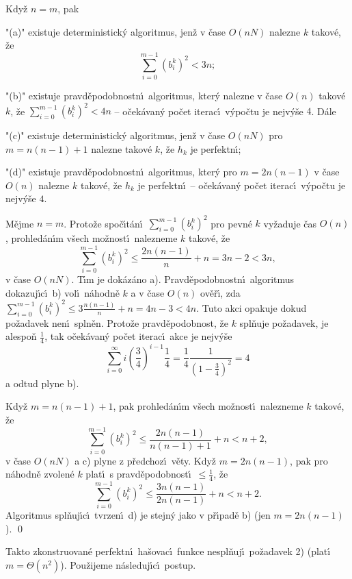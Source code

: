 Kdy\v z $n=m$, pak 
\roster
\item"{(a)}"
existuje deterministick\'y algoritmus, jen\v z v \v case $O(nN)$ 
nalezne $k$ takov\'e, \v ze $$\sum_{i=0}^{m-1}(b_i^k)^2<3n;$$
\item"{(b)}"
existuje pravd\v epodobnostn\'\i\ algoritmus, kter\'y 
nalezne v \v case $O(n)$ takov\'e $k$, \v ze $\sum_{i=0}^{m-1}(b_
i^k)^2<4n$ -- o\v cek\'avan\'y po\v cet iterac\'\i\ v\'ypo\v ctu je nejv\'y\v se $
4$.
\endroster
D\'ale 
\roster
\item"{(c)}"
existuje deterministick\'y algoritmus, jen\v z v \v case $O(nN)$ pro 
$m=n(n-1)+1$ nalezne takov\'e $k$, \v ze $h_k$ je 
perfektn\'\i ;
\item"{(d)}"
existuje pravd\v epodobnostn\'\i\ algoritmus, kter\'y pro 
$m=2n(n-1)$ v \v case $O(n)$ nalezne $k$ takov\'e, \v ze $h_k$ je 
perfektn\'\i\ -- o\v cek\'avan\'y po\v cet iterac\'\i\ v\'ypo\v ctu 
je nejv\'y\v se $4$.
\endroster
\endproclaim

M\v ejme $n=m$. Proto\v ze spo\v c\'\i t\'an\'\i\ 
$\sum_{i=0}^{m-1}(b_i^k)^2$ pro pevn\'e $k$ vy\v zaduje \v cas $O
(n)$, prohled\'an\'\i m 
v\v sech mo\v znost\'\i\ nalez\-ne\-me $k$ takov\'e, \v ze 
$$\sum_{i=0}^{m-1}(b_i^k)^2\le\frac {2n(n-1)}n+n=3n-2<3n,$$
v \v case $O(nN)$. T\'\i m je 
dok\'az\'ano a). Pravd\v epodobnostn\'\i\ algoritmus dokazuj\'\i c\'\i\ b) vol\'\i\ 
n\'ahodn\v e $k$ a v \v case $O(n)$ ov\v e\v r\'\i , zda 
$\sum_{i=0}^{m-1}(b_i^k)^2\le 3\frac {n(n-1)}n+n=4n-3<4n$. Tuto akci opakuje dokud 
po\v zadavek nen\'\i\ spln\v en. Proto\v ze pravd\v epodobnost, \v ze $
k$ spl\v nuje 
po\v zadavek, je alespo\v n $\frac 14$, tak o\v cek\'avan\'y po\v cet ite\-rac\'\i\ 
akce je nejv\'y\v se 
$$\sum_{i=0}^{\infty}i(\frac 34)^{i-1}\frac 14=\frac 14\frac 1{(1
-\frac 34)^2}=4$$
a odtud plyne b). 

\flushpar Kdy\v z $m=n(n-1)+1$, pak prohled\'an\'\i m v\v sech mo\v znost\'\i\ 
nalezne\-me $k$ takov\'e, \v ze $$\sum_{i=0}^{m-1}(b_i^k)^2\le\frac {
2n(n-1)}{n(n-1)+1}+n<n+2,$$ v 
\v case $O(nN)$ a c) plyne z p\v redchoz\'\i\ v\v ety. Kdy\v z 
$m=2n(n-1)$, pak pro n\'ahodn\v e zvolen\'e $k$ plat\'\i\ s 
pravd\v epodobnost\'\i\ $\le\frac 14$, \v ze 
$$\sum_{i=0}^{m-1}(b_i^k)^2\le\frac {3n(n-1)}{2n(n-1)}+n<n+2.$$
Algoritmus spl\v nuj\'\i c\'\i\ tvrzen\'\i\ d) je stejn\'y jako 
v p\v r\'\i pad\v e b) (jen $m=2n(n-1)$). \qed
\enddemo

\flushpar Takto zkonstruovan\'e perfektn\'\i\ ha\v sovac\'\i\ funkce 
nespl\v nuj\'\i\ po\v za\-davek 2) (plat\'\i\ $m=\Theta (n^2)$).  Pou\v zijeme n\'asleduj\'\i c\'\i\ 
postup. 
\medskip

